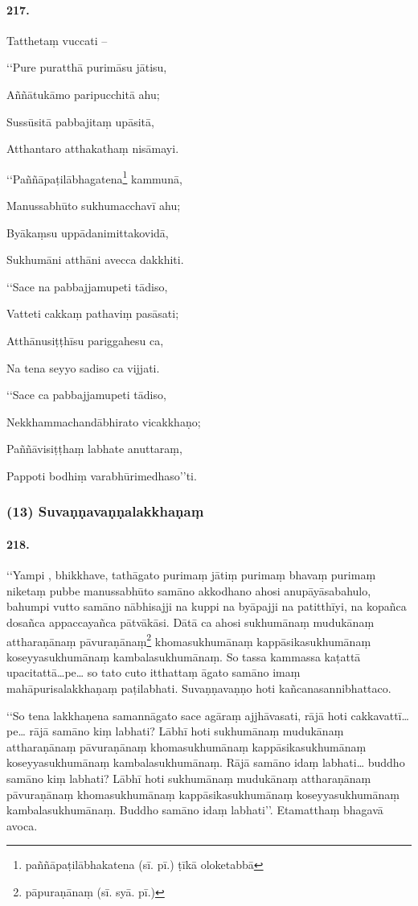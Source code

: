 \paragraph{217.} Tatthetaṃ vuccati –

‘‘Pure puratthā purimāsu jātisu,

Aññātukāmo paripucchitā ahu;

Sussūsitā pabbajitaṃ upāsitā,

Atthantaro atthakathaṃ nisāmayi.

‘‘Paññāpaṭilābhagatena\footnote{paññāpaṭilābhakatena (sī. pī.) ṭīkā oloketabbā} kammunā,

Manussabhūto sukhumacchavī ahu;

Byākaṃsu uppādanimittakovidā,

Sukhumāni atthāni avecca dakkhiti.

‘‘Sace na pabbajjamupeti tādiso,

Vatteti cakkaṃ pathaviṃ pasāsati;

Atthānusiṭṭhīsu pariggahesu ca,

Na tena seyyo sadiso ca vijjati.

‘‘Sace ca pabbajjamupeti tādiso,

Nekkhammachandābhirato vicakkhaṇo;

Paññāvisiṭṭhaṃ labhate anuttaraṃ,

Pappoti bodhiṃ varabhūrimedhaso’’ti.

\subsubsection{(13) Suvaṇṇavaṇṇalakkhaṇaṃ}

\paragraph{218.} ‘‘Yampi , bhikkhave, tathāgato purimaṃ jātiṃ purimaṃ bhavaṃ purimaṃ niketaṃ pubbe manussabhūto samāno akkodhano ahosi anupāyāsabahulo, bahumpi vutto samāno nābhisajji na kuppi na byāpajji na patitthīyi, na kopañca dosañca appaccayañca pātvākāsi. Dātā ca ahosi sukhumānaṃ mudukānaṃ attharaṇānaṃ pāvuraṇānaṃ\footnote{pāpuraṇānaṃ (sī. syā. pī.)} khomasukhumānaṃ kappāsikasukhumānaṃ koseyyasukhumānaṃ kambalasukhumānaṃ. So tassa kammassa kaṭattā upacitattā…pe… so tato cuto itthattaṃ āgato samāno imaṃ mahāpurisalakkhaṇaṃ paṭilabhati. Suvaṇṇavaṇṇo hoti kañcanasannibhattaco.

‘‘So tena lakkhaṇena samannāgato sace agāraṃ ajjhāvasati, rājā hoti cakkavattī…pe… rājā samāno kiṃ labhati? Lābhī hoti sukhumānaṃ mudukānaṃ attharaṇānaṃ pāvuraṇānaṃ khomasukhumānaṃ kappāsikasukhumānaṃ koseyyasukhumānaṃ kambalasukhumānaṃ. Rājā samāno idaṃ labhati… buddho samāno kiṃ labhati? Lābhī hoti sukhumānaṃ mudukānaṃ attharaṇānaṃ pāvuraṇānaṃ khomasukhumānaṃ kappāsikasukhumānaṃ koseyyasukhumānaṃ kambalasukhumānaṃ. Buddho samāno idaṃ labhati’’. Etamatthaṃ bhagavā avoca.

